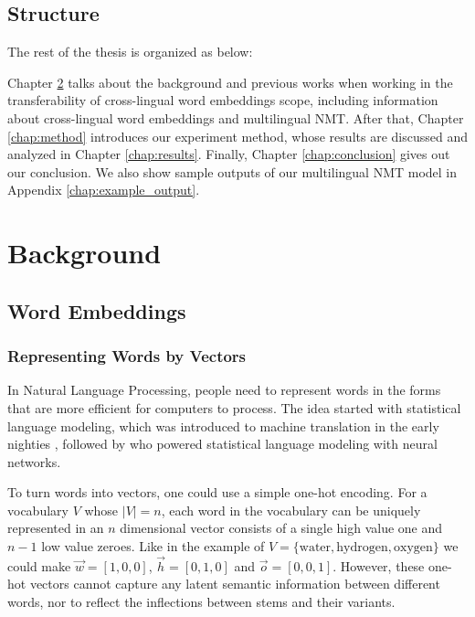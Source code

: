 \documentclass[thesis,fonts=libertine]{cluu}
\begin{document}
\section{Structure}

The rest of the thesis is organized as below:

Chapter \ref{chap:background} talks about the background and previous works when working in the transferability of cross-lingual word embeddings scope, including information about cross-lingual word embeddings and multilingual NMT. After that, Chapter \ref{chap:method} introduces our experiment method, whose results are discussed and analyzed in Chapter \ref{chap:results}. Finally, Chapter \ref{chap:conclusion} gives out our conclusion. We also show sample outputs of our multilingual NMT model in Appendix \ref{chap:example_output}.

\chapter{Background}
\label{chap:background}

\section{Word Embeddings}
\subsection{Representing Words by Vectors}

In Natural Language Processing, people need to represent words in the forms that are more efficient for computers to process. The idea started with statistical language modeling, which was introduced to machine translation in the early nighties \parencite{brown-etal-1990-statistical}, followed by \textcite{bengio2003neural} who powered statistical language modeling with neural networks.

To turn words into vectors, one could use a simple one-hot encoding. For a vocabulary $V$ whose $|V|=n$, each word in the vocabulary can be uniquely represented in an $n$ dimensional vector consists of a single high value one and $n-1$ low value zeroes. Like in the example of $V=\{\text{water}, \text{hydrogen}, \text{oxygen}\}$ we could make $\vec{w}=[1, 0, 0]$, $\vec{h}=[0, 1, 0]$ and $\vec{o}=[0, 0, 1]$. However, these one-hot vectors cannot capture any latent semantic information between different words, nor to reflect the inflections between stems and their variants.
\end{document}

